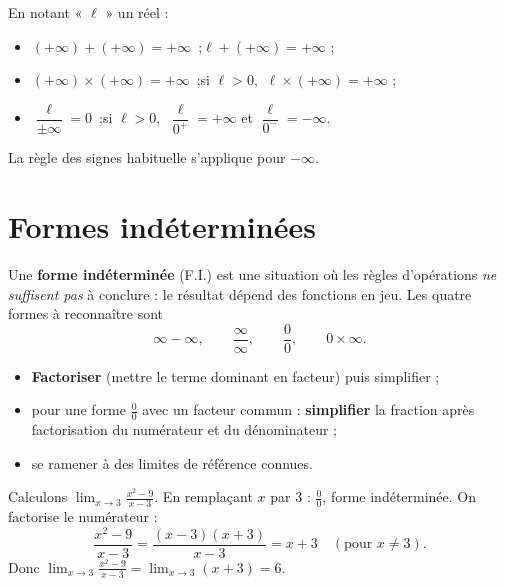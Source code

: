 \begin{aretenir}
En notant « $\ell$ » un réel :
\begin{itemize}
  \item $(+\infty)+(+\infty)=+\infty$\ ;\quad $\ell+(+\infty)=+\infty$ ;
  \item $(+\infty)\times(+\infty)=+\infty$\ ;\quad si $\ell>0$, $\ \ell\times(+\infty)=+\infty$ ;
  \item $\dfrac{\ell}{\pm\infty}=0$\ ;\quad si $\ell>0$, $\ \dfrac{\ell}{0^+}=+\infty$ et $\dfrac{\ell}{0^-}=-\infty$.
\end{itemize}
La règle des signes habituelle s'applique pour $-\infty$.
\end{aretenir}

\section{Formes indéterminées}

\begin{definition}
Une \textbf{forme indéterminée} (F.I.) est une situation où les règles d'opérations
\emph{ne suffisent pas} à conclure : le résultat dépend des fonctions en jeu. Les
quatre formes à reconnaître sont
\[ \infty-\infty,\qquad \frac{\infty}{\infty},\qquad \frac{0}{0},\qquad 0\times\infty. \]
\end{definition}

\begin{aretenir}
\begin{itemize}
  \item \textbf{Factoriser} (mettre le terme dominant en facteur) puis simplifier ;
  \item pour une forme $\frac00$ avec un facteur commun : \textbf{simplifier} la
        fraction après factorisation du numérateur et du dénominateur ;
  \item se ramener à des limites de référence connues.
\end{itemize}
\end{aretenir}

\begin{exemple}
Calculons $\displaystyle\lim_{x\to 3}\frac{x^2-9}{x-3}$. En remplaçant $x$ par $3$ :
$\frac{0}{0}$, forme indéterminée. On factorise le numérateur :
\[ \frac{x^2-9}{x-3}=\frac{(x-3)(x+3)}{x-3}=x+3\quad(\text{pour } x\neq 3). \]
Donc $\displaystyle\lim_{x\to 3}\frac{x^2-9}{x-3}=\lim_{x\to 3}(x+3)=6.$
\end{exemple}

